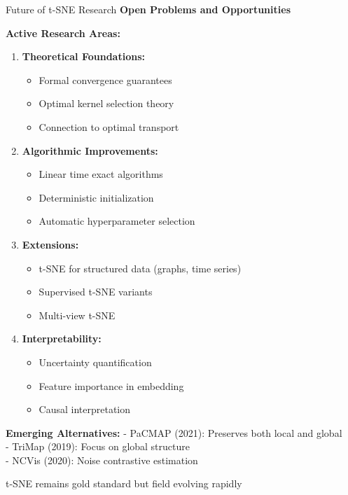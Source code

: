 \documentclass[10pt]{beamer}
\newcommand{\emphtext}[1]{\textcolor{upcblue}{\textbf{#1}}}
\newcommand{\conceptbox}[1]{\colorbox{upcblue!10}{\begin{minipage}{0.85\textwidth}\centering #1\end{minipage}}}
\begin{document}
\begin{frame}{Future of t-SNE Research}
\emphtext{Open Problems and Opportunities}

\vspace{0.3cm}
\textbf{Active Research Areas:}

\begin{enumerate}
\footnotesize
\item \textbf{Theoretical Foundations:}
   \begin{itemize}
   \tiny
   \item Formal convergence guarantees
   \item Optimal kernel selection theory
   \item Connection to optimal transport
   \end{itemize}

\item \textbf{Algorithmic Improvements:}
   \begin{itemize}
   \tiny
   \item Linear time exact algorithms
   \item Deterministic initialization
   \item Automatic hyperparameter selection
   \end{itemize}

\item \textbf{Extensions:}
   \begin{itemize}
   \tiny
   \item t-SNE for structured data (graphs, time series)
   \item Supervised t-SNE variants
   \item Multi-view t-SNE
   \end{itemize}

\item \textbf{Interpretability:}
   \begin{itemize}
   \tiny
   \item Uncertainty quantification
   \item Feature importance in embedding
   \item Causal interpretation
   \end{itemize}
\end{enumerate}

\vspace{0.3cm}
\textbf{Emerging Alternatives:}
\footnotesize
- PaCMAP (2021): Preserves both local and global\\
- TriMap (2019): Focus on global structure\\
- NCVis (2020): Noise contrastive estimation

\begin{center}
\conceptbox{\footnotesize t-SNE remains gold standard but field evolving rapidly}
\end{center}
\end{frame}
\end{document}
